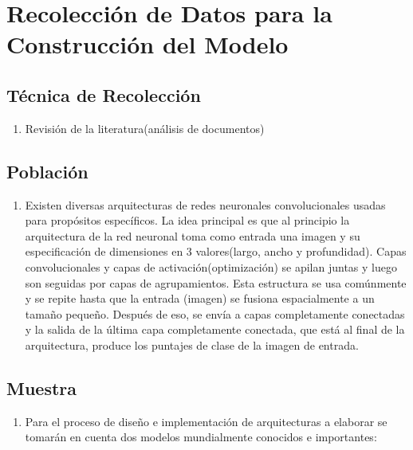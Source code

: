 	\vskip 0.4cm
	\section{Recolección de Datos para la Construcción del Modelo}
		
		\subsection{Técnica de Recolección}
		\begin{enumerate}		
			\item[]   {Revisión de la literatura(análisis de documentos)}
		\end{enumerate}

		\subsection{Población}
		\begin{enumerate}		
			\item[] Existen diversas arquitecturas de redes neuronales convolucionales usadas para propósitos específicos. La idea principal es que al principio la arquitectura de la red neuronal toma como entrada una imagen y su especificación de dimensiones en 3 valores(largo, ancho y profundidad). Capas convolucionales y capas de activación(optimización) se apilan juntas y luego son seguidas por capas de agrupamientos. Esta estructura se usa comúnmente y se repite hasta que la entrada (imagen) se fusiona espacialmente a un tamaño pequeño. Después de eso, se envía a capas completamente conectadas y la salida de la última capa completamente conectada, que está al final de la arquitectura, produce los puntajes de clase de la imagen de entrada.
		\end{enumerate}
		
	
		\subsection{Muestra}
		\begin{enumerate}		
		\item[] Para el proceso de diseño e implementación de arquitecturas a elaborar se tomarán en cuenta dos modelos mundialmente conocidos e importantes:
		\end{enumerate}
				
		
